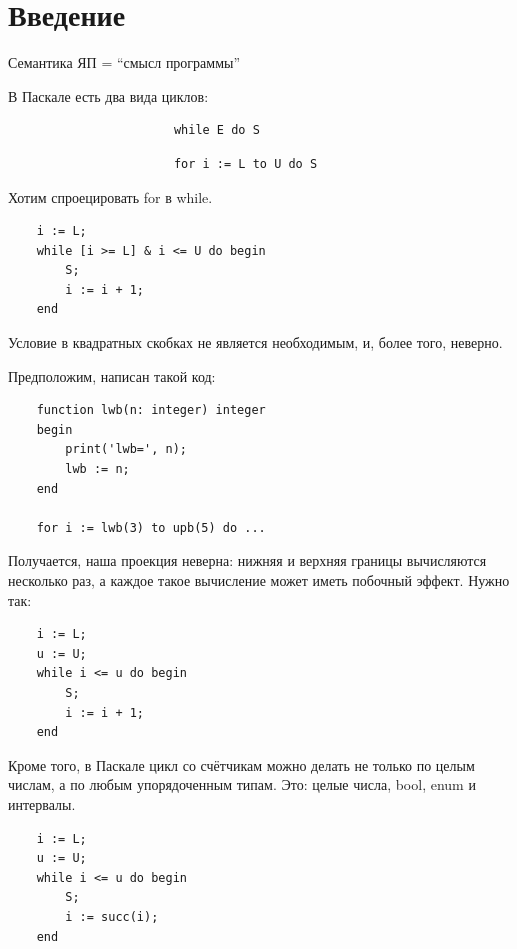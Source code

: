 \chapter{Введение}

Семантика ЯП = ``смысл программы''

В Паскале есть два вида циклов:

\begin{figure}[h]
	\centering
	\begin{subfigure}{.49\textwidth}
		\begin{verbatim}
			while E do S
		\end{verbatim}
	\end{subfigure}
	\begin{subfigure}{.49\textwidth}
		\begin{verbatim}
			for i := L to U do S
		\end{verbatim}
	\end{subfigure}
\end{figure}

Хотим спроецировать for в while.

\begin{verbatim}
	i := L;
	while [i >= L] & i <= U do begin
		S;
		i := i + 1;
	end
\end{verbatim}

Условие в квадратных скобках не является необходимым, и, более того, неверно.

Предположим, написан такой код:

\begin{verbatim}
	function lwb(n: integer) integer
	begin
		print('lwb=', n);
		lwb := n;
	end

	for i := lwb(3) to upb(5) do ...
\end{verbatim}

Получается, наша проекция неверна: нижняя и верхняя границы вычисляются несколько раз, а каждое
такое вычисление может иметь побочный эффект.
Нужно так:

\begin{verbatim}
	i := L;
	u := U;
	while i <= u do begin
		S;
		i := i + 1;
	end
\end{verbatim}

Кроме того, в Паскале цикл со счётчикам можно делать не только по целым числам, а по любым
упорядоченным типам.
Это: целые числа, bool, enum и интервалы.

\begin{verbatim}
	i := L;
	u := U;
	while i <= u do begin
		S;
		i := succ(i);
	end
\end{verbatim}

